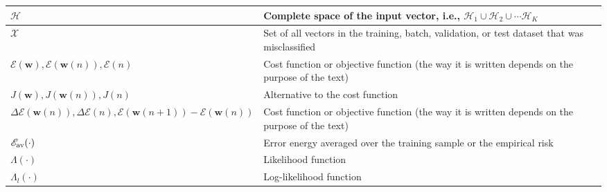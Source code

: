 \documentclass{article}
\begin{document}
\begin{xltabular}{\textwidth}{XX}
	\(\mathscr{H}\)                                                                                                       & Complete space of the input vector, i.e., \(\mathscr{H}_1 \cup \mathscr{H}_2 \cup \cdots \mathscr{H}_K \)                                                                                                                    \\ \hline
    \(\mathscr{X}\) \cite{haykinNeuralNetworksLearning2009} & Set of all vectors in the training, batch, validation, or test dataset that was misclassified \\ \hline
	\(\mathscr{E}(\mathbf{w}), \mathscr{E}(\mathbf{w}(n)), \mathscr{E}(n)\)                                               & Cost function or objective function (the way it is written depends on the purpose of the text)                                                                                                                               \\ \hline
	\(J(\mathbf{w}), J(\mathbf{w}(n)), J(n)\)                                                                             & Alternative to the cost function                                                                                                                                                                                             \\ \hline
	\(\Delta\mathscr{E}(\mathbf{w}(n)), \Delta\mathscr{E}(n), \mathscr{E}(\mathbf{w}(n+1)) - \mathscr{E}(\mathbf{w}(n))\) & Cost function or objective function (the way it is written depends on the purpose of the text)                                                                                                                               \\ \hline
	\(\mathscr{E}_{\textnormal{av}}(\cdot)\)                                                                              & Error energy averaged over the training sample or the empirical risk  \cite{bishopPatternRecognitionMachine2006}                                                                                                             \\ \hline
	\(\Lambda(\cdot)\)                                                                                                    & Likelihood function                                                                                                                                                                                                          \\ \hline
	\(\Lambda_l(\cdot)\)                                                                                                  & Log-likelihood function                                                                                                                                                                                                      \\ \hline

\end{xltabular}
\end{document}
